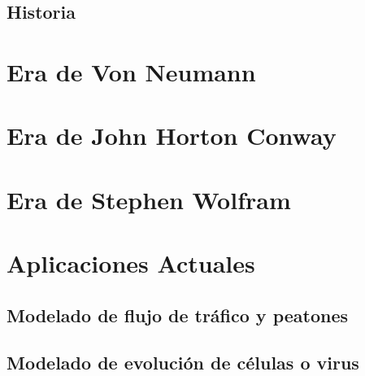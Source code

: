 \subsection{Historia}



\section{Era de Von Neumann} %


\section{Era de John Horton Conway} %



\section{Era de Stephen Wolfram} %


\section{Aplicaciones Actuales} %

\subsection{Modelado de flujo de tráfico y peatones}

\subsection{Modelado de evolución de células o virus}







